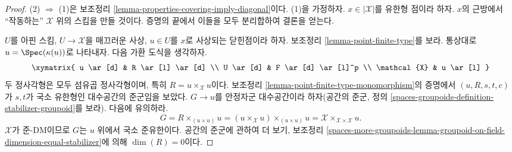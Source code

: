 \begin{proof}
(2) $\Rightarrow$ (1)은 보조정리
\ref{lemma-properties-covering-imply-diagonal}이다. (1)을 가정하자.
$x \in |\mathcal{X}|$를 유한형 점이라 하자. $x$의 근방에서 ``작동하는''
$\mathcal{X}$ 위의 스킴을 만들 것이다. 증명의 끝에서 이들을 모두
분리합하여 결론을 얻는다.

\medskip\noindent
$U$를 아핀 스킴, $U \to \mathcal{X}$을 매끄러운 사상, $u \in U$를
$x$로 사상되는 닫힌점이라 하자. 보조정리
\ref{lemma-point-finite-type}를 보라. 통상대로
$u = \Spec(\kappa(u))$로 나타내자. 다음 가환 도식을 생각하자.
$$
\xymatrix{
u \ar[d] & R \ar[l] \ar[d] \\
U \ar[d] & F \ar[d] \ar[l]^p \\
\mathcal{X} & u \ar[l]
}
$$
두 정사각형은 모두 섬유곱 정사각형이며, 특히
$R = u \times_\mathcal{X} u$이다. 보조정리
\ref{lemma-point-finite-type-monomorphism}의 증명에서
$(u, R, s, t, c)$가 $s, t$가 국소 유한형인 대수공간의 준군임을 보았다.
$G \to u$를 안정자군 대수공간이라 하자(공간의 준군, 정의
\ref{spaces-groupoids-definition-stabilizer-groupoid}를 보라).
다음에 유의하라.
$$
G = R \times_{(u \times u)} u =
(u \times_\mathcal{X} u) \times_{(u \times u)} u =
\mathcal{X} \times_{\mathcal{X} \times \mathcal{X}} u.
$$
$\mathcal{X}$가 준-DM이므로 $G$는 $u$ 위에서 국소 준유한이다.
공간의 준군에 관하여 더 보기, 보조정리
\ref{spaces-more-groupoids-lemma-groupoid-on-field-dimension-equal-stabilizer}에
의해 $\dim(R) = 0$이다.


\end{proof}
